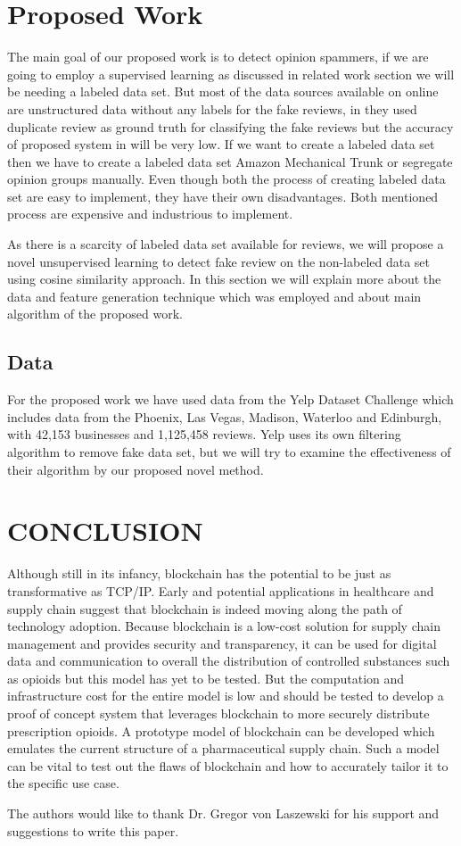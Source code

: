 \documentclass[sigconf]{acmart}
\begin{document}
\section{Proposed Work}
The main goal of our proposed work is to detect opinion spammers, if we are going to employ a supervised learning as discussed in related work section we will be needing a labeled data set. But most of the data sources available on online are unstructured data without any labels for the fake reviews, in \cite{2} they used duplicate review as ground truth for classifying the fake reviews but the accuracy of proposed system in \cite{2} will be very low. If we want to create a labeled data set then we have to create a labeled data set Amazon Mechanical Trunk \cite{} or segregate opinion groups manually. Even though both the process of creating labeled data set are easy to implement, they have their own disadvantages. Both mentioned process are expensive and industrious to implement. 

As there is a scarcity of labeled data set available for reviews, we will propose a novel unsupervised learning to detect fake review on the non-labeled data set using cosine similarity approach. In this section we will explain more about the data and feature generation technique which was employed and about main algorithm of the proposed work.

\subsection{Data}
For the proposed work we have used data from the Yelp Dataset Challenge which includes data from the Phoenix, Las Vegas, Madison, Waterloo and Edinburgh, with 42,153 businesses and 1,125,458 reviews. Yelp uses its own filtering algorithm to remove fake data set, but we will try to examine the effectiveness of their algorithm by our proposed novel method.





\section{CONCLUSION}
Although still in its infancy, blockchain has the potential to be just as transformative as TCP/IP. Early and potential applications in healthcare and supply chain suggest that blockchain is indeed moving along the path of technology adoption. Because blockchain is a low-cost solution for supply chain management and provides security and transparency, it can be used for digital data and communication to overall the distribution of controlled substances such as opioids but this model has yet to be tested. But the computation and infrastructure cost for the entire model is low and should be tested to develop a proof of concept system that leverages blockchain to more securely distribute prescription opioids. A prototype model of blockchain can be developed which emulates the current structure of a pharmaceutical supply chain. Such a model can be vital to test out the flaws of blockchain and how to accurately tailor it to the specific use case.  

\begin{acks}
The authors would like to thank Dr. Gregor von Laszewski for his support and suggestions to write this paper.
\end{acks}


 

\appendix


\end{document}
